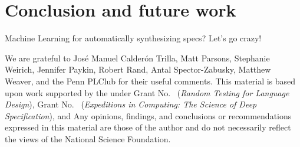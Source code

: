 \documentclass[acmsmall,review]{acmart}\settopmatter{}
\begin{document}
\section{Conclusion and future work}
\label{sec:concl}

Machine Learning for automatically synthesizing specs? Let's go crazy!

\begin{acks}                            %
We are grateful to
%
José Manuel Calderón Trilla,
Matt Parsons,
Stephanie Weirich,
Jennifer Paykin,
Robert Rand,
Antal Spector-Zabusky,
Matthew Weaver,
and the Penn PLClub
for their useful comments.
This material is based upon work supported by the
 under Grant
No.~ ({\em Random Testing for Language
Design}), Grant No.~ ({\em Expeditions
in Computing: The Science of Deep Specification}), and  Any opinions, findings, and
conclusions or recommendations expressed in this material are those of
the author and do not necessarily reflect the views of the National
Science Foundation.

\end{acks}

%



%
\end{document}
